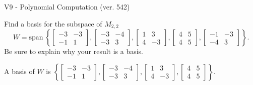 \begin{exercise}
  \begin{exerciseTitle}V9 - Polynomial Computation (ver. 542)\end{exerciseTitle}
  \begin{exerciseStatement}
    Find a basis for the subspace of \(M_{2,2}\) 
\[W=\mathrm{span}\ \left\{\left[\begin{array}{cc}
-3 & -3 \\
-1 & 1
\end{array}\right] , \left[\begin{array}{cc}
-3 & -4 \\
-3 & 3
\end{array}\right] , \left[\begin{array}{cc}
1 & 3 \\
4 & -3
\end{array}\right] , \left[\begin{array}{cc}
4 & 5 \\
4 & 5
\end{array}\right] , \left[\begin{array}{cc}
-1 & -3 \\
-4 & 3
\end{array}\right]\right\}.\]
 Be sure to explain why your result is a basis.


  \end{exerciseStatement}
  \begin{exerciseAnswer}
   A basis of \(W\) is  \(\left\{\left[\begin{array}{cc}
-3 & -3 \\
-1 & 1
\end{array}\right] , \left[\begin{array}{cc}
-3 & -4 \\
-3 & 3
\end{array}\right] , \left[\begin{array}{cc}
1 & 3 \\
4 & -3
\end{array}\right] , \left[\begin{array}{cc}
4 & 5 \\
4 & 5
\end{array}\right]\right\}\).
  


  \end{exerciseAnswer}
\end{exercise}